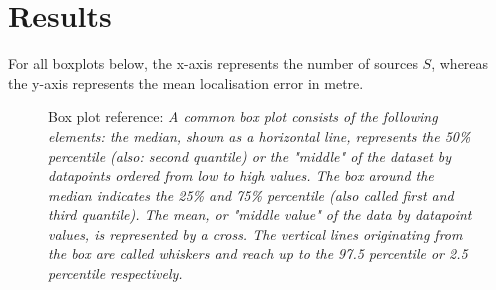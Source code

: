 \setcounter{topnumber}{2}
\setcounter{bottomnumber}{2}
\setcounter{totalnumber}{4}
\renewcommand{\topfraction}{0.85}
\renewcommand{\bottomfraction}{0.85}
\renewcommand{\textfraction}{0.15}
\renewcommand{\floatpagefraction}{0.8}
\renewcommand{\textfraction}{0.1}
\setlength{\floatsep}{5pt plus 2pt minus 2pt}
\setlength{\textfloatsep}{5pt plus 2pt minus 2pt}
\setlength{\intextsep}{5pt plus 2pt minus 2pt}

\setlength\figureheight{7cm}
\setlength\figurewidth{\textwidth}

\section{Results}
\label{chap:results}

For all boxplots below, the x-axis represents the number of sources $S$, whereas the y-axis represents the mean localisation error in metre.

\newcommand{\boxplotDescription}{Mean Localisation Error across Number of Sources $S$\ }

\begin{figure}[H]
    \setlength\figurewidth{5cm}
	\centering
	
	\caption[Box plot reference]{Box plot reference: \itshape A common box plot consists of the following elements: the median, shown as a horizontal line, represents the 50\% percentile (also: second quantile) or the "middle" of the dataset by datapoints ordered from low to high values. The box around the median indicates the 25\% and 75\% percentile (also called first and third quantile). The mean, or "middle value" of the data by datapoint values, is represented by a cross. The vertical lines originating from the box are called whiskers and reach up to the 97.5 percentile or 2.5 percentile respectively.}
	\label{fig:boxplot-reference}
\end{figure}


